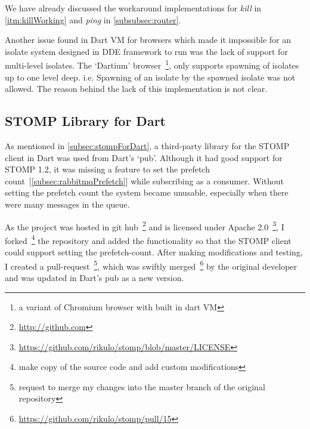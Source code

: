   We have already discussed the workaround implementations for \emph{kill} in \autoref{itm:killWorking} and \emph{ping} in \autoref{subsubsec:router}.

  Another issue found in Dart VM for browsers which made it impossible for an isolate system designed in DDE framework to run was the lack of support for multi-level isolates. The ‘Dartium’ browser~\footnote{a variant of Chromium browser with built in dart VM}, only supports spawning of isolates up to one level deep. i.e. Spawning of an isolate by the spawned isolate was not allowed. The reason behind the lack of this implementation is not clear.

\subsection{STOMP Library for Dart}
  As mentioned in \autoref{subsec:stompForDart}, a third-party library for the STOMP client in Dart was used from Dart's ‘pub’. Although it had good support for STOMP 1.2, it was missing a feature to set the prefetch count~[\autoref{subsec:rabbitmqPrefetch}] while subscribing as a consumer. Without setting the prefetch count the system became unusable, especially when there were many messages in the queue.

  As the project was hosted in git hub~\footnote{\url{http://github.com}} and is licensed under Apache 2.0~\footnote{\url{https://github.com/rikulo/stomp/blob/master/LICENSE}}, I forked~\footnote{make copy of the source code and add custom modifications} the repository and added the functionality so that the STOMP client could support setting the prefetch-count. After making modifications and testing, I created a pull-request~\footnote{request to merge my changes into the master branch of the original repository}, which was swiftly merged~\footnote{\url{https://github.com/rikulo/stomp/pull/15}} by the original developer and was updated in Dart's pub as a new version.
